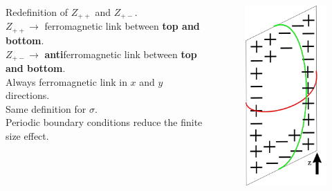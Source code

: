 \documentclass[12pt,handout]{beamer}
\begin{document}
\begin{frame}
\begin{center}

\begin{columns}
\begin{column}{0.50\textwidth}
\begin{center}
Redefinition of $Z_{++}$ and $Z_{+-}$.\\
\vspace{10pt}
$Z_{++} \rightarrow $ ferromagnetic link between \textbf{top and bottom}.\\
$Z_{+-} \rightarrow $ \textbf{anti}ferromagnetic link between \textbf{top and bottom}.\\
\vspace{10pt}
Always ferromagnetic link in $x$ and $y$ directions.\\
\vspace{10pt}
Same definition for $\sigma$.\\
\vspace{10pt}
Periodic boundary conditions reduce the finite size effect.\\
\end{center}

\end{column}
\begin{column}{0.50\textwidth}

\begin{figure}[!htb]
\centering
\includegraphics[scale=0.6]{antiferro.png}
\end{figure}

\end{column}
\end{columns}

\end{center}
\end{frame}
\end{document}
